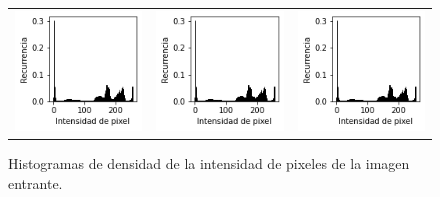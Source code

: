\begin{figure}[!b]
\begin{tabular}{ccc}
        \includegraphics[width=4cm]{../Plots/THR/threshold_input_6.png} &
        \includegraphics[width=4cm]{../Plots/THR/threshold_input_7.png} &
        \includegraphics[width=4cm]{../Plots/THR/threshold_input_8.png} \\

    \end{tabular}        
    \caption{Histogramas de densidad de la intensidad de pixeles de la imagen entrante.}
    \label{fig:thresh_input_1}
\end{figure}

